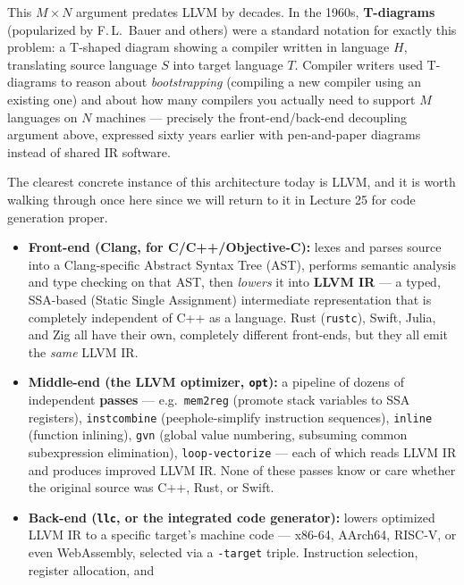 \documentclass[full-course-notes.tex]{subfiles}
\begin{document}
\begin{historynote}
This $M \times N$ argument predates LLVM by decades. In the 1960s, \textbf{T-diagrams}
(popularized by F.\,L.\ Bauer and others) were a standard notation for exactly this problem:
a T-shaped diagram showing a compiler written in language $H$, translating source language $S$
into target language $T$. Compiler writers used T-diagrams to reason about \emph{bootstrapping}
(compiling a new compiler using an existing one) and about how many compilers you actually need
to support $M$ languages on $N$ machines --- precisely the front-end/back-end decoupling
argument above, expressed sixty years earlier with pen-and-paper diagrams instead of shared IR
software.
\end{historynote}

\begin{enrichment}
The clearest concrete instance of this architecture today is LLVM, and it is worth walking
through once here since we will return to it in Lecture 25 for code generation proper.
\begin{itemize}
  \item \textbf{Front-end (Clang, for C/C++/Objective-C):} lexes and parses source into a
  Clang-specific Abstract Syntax Tree (AST), performs semantic analysis and type checking on
  that AST, then \emph{lowers} it into \textbf{LLVM IR} --- a typed, SSA-based (Static Single
  Assignment) intermediate representation that is completely independent of C++ as a language.
  Rust (\texttt{rustc}), Swift, Julia, and Zig all have their own, completely different
  front-ends, but they all emit the \emph{same} LLVM IR.
  \item \textbf{Middle-end (the LLVM optimizer, \texttt{opt}):} a pipeline of dozens of
  independent \textbf{passes} --- e.g.\ \texttt{mem2reg} (promote stack variables to SSA
  registers), \texttt{instcombine} (peephole-simplify instruction sequences),
  \texttt{inline} (function inlining), \texttt{gvn} (global value numbering, subsuming common
  subexpression elimination), \texttt{loop-vectorize} --- each of which reads LLVM IR and
  produces improved LLVM IR. None of these passes know or care whether the original source was
  C++, Rust, or Swift.
  \item \textbf{Back-end (\texttt{llc}, or the integrated code generator):} lowers optimized
  LLVM IR to a specific target's machine code --- x86-64, AArch64, RISC-V, or even WebAssembly,
  selected via a \texttt{-target} triple. Instruction selection, register allocation, and

\end{itemize}
\end{enrichment}
\end{document}
